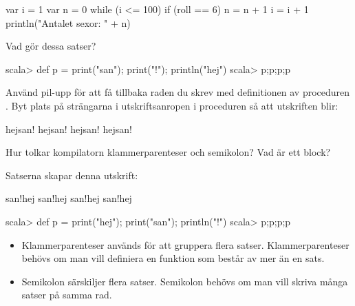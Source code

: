 \SubtaskSolved
\begin{Code}
var i = 1
var n = 0
while (i <= 100) {
  if (roll == 6) n = n + 1
  i = i + 1
}
println("Antalet sexor: " + n)
\end{Code}


\QUESTEND




\QUESTBEGIN

\Task \what

\Subtask Vad gör dessa satser?
\begin{REPLnonum}
scala> def p = { print("san"); print("!"); println("hej")}
scala> p;p;p;p
\end{REPLnonum}

\Subtask
Använd pil-upp för att få tillbaka raden du skrev med definitionen av proceduren . Byt plats på strängarna i utskriftsanropen i proceduren  så att utskriften blir:
\begin{REPLnonum}
hejsan!
hejsan!
hejsan!
hejsan!
\end{REPLnonum}

\Subtask Hur tolkar kompilatorn klammerparenteser och semikolon? Vad är ett block?

\SOLUTION

\TaskSolved \what

\SubtaskSolved
Satserna skapar denna utskrift:
\begin{REPLnonum}
san!hej
san!hej
san!hej
san!hej
\end{REPLnonum}

\SubtaskSolved
\begin{REPLnonum}
scala> def p = { print("hej"); print("san"); println("!")}
scala> p;p;p;p
\end{REPLnonum}

\SubtaskSolved
\begin{itemize}
\item Klammerparenteser används för att gruppera flera satser. Klammerparenteser behövs om man vill definiera en funktion som består av mer än en sats.

\item Semikolon särskiljer flera satser. Semikolon behövs om man vill skriva många satser på samma rad.


\end{itemize}

\QUESTEND





